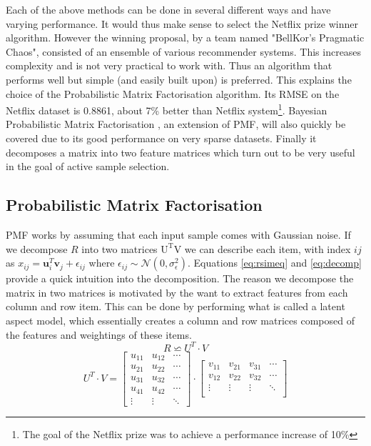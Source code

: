 Each of the above methods can be done in several different ways and have varying performance. It would thus make sense to select the Netflix prize winner algorithm. However the winning proposal, by a team named "BellKor's Pragmatic Chaos", consisted of an ensemble of various recommender systems. This increases complexity and is not very practical to work with. Thus an algorithm that performs well but simple (and easily built upon) is preferred. This explains the choice of the Probabilistic Matrix Factorisation algorithm. Its RMSE on the Netflix dataset is 0.8861, about 7\% better than Netflix system\footnote{The goal of the Netflix prize was to achieve a performance increase of 10\%}. Bayesian Probabilistic Matrix Factorisation \cite{SalMnih2008}, an extension of PMF, will also quickly be covered due to its good performance on very sparse datasets. Finally it decomposes a matrix into two feature matrices which turn out to be very useful in the goal of active sample selection.

\subsection{Probabilistic Matrix Factorisation}
\label{sec:pmf}
PMF works by assuming that each input sample comes with Gaussian noise. If we decompose $R$ into two matrices $\mathrm{U^{T} V}$ we can describe each item, with index $ij$ as $x_{ij}=\mathbf{u}_{i}^{T}\mathbf{v}_{j}+\epsilon_{ij}$ where $\epsilon_{ij} \sim  \mathcal{N} (0,\sigma^2_\epsilon)$. Equations \ref{eq:rsimeq} and \ref{eq:decomp} provide a quick intuition into the decomposition. The reason we decompose the matrix in two matrices is motivated by the want to extract features from each column and row item. This can be done by performing what is called a latent aspect model, which essentially creates a column and row matrices composed of the features and weightings of these items.
\begin{equation} \label{eq:rsimeq}
R \backsimeq U^{T} \cdot V
\end{equation}
\begin{equation}
 \label{eq:decomp}
U^{T} \cdot V=\begin{bmatrix}
u_{11} & u_{12} & \cdots \\
u_{21} & u_{22}& \cdots \\
u_{31}  & u_{32} & \cdots \\
u_{41}  & u_{42} & \cdots \\
\vdots  & \vdots & \ddots
\end{bmatrix} \cdot \begin{bmatrix}
v_{11} & v_{21} & v_{31} &  \cdots \\[-0.1em] 
v_{12} & v_{22} & v_{32} & \cdots \\[-0.1em]
\vdots & \vdots & \vdots &  \ddots \\[-0.1em]
\end{bmatrix}
\end{equation}

